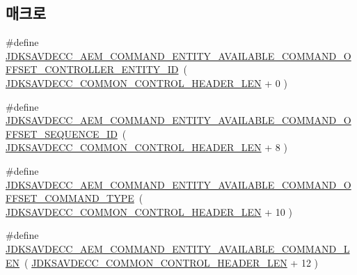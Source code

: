 \subsection*{매크로}
\begin{DoxyCompactItemize}
\item 
\#define \hyperlink{group__command__entity__available_ga964e8474e86735a78da5f889d44f0a71}{J\+D\+K\+S\+A\+V\+D\+E\+C\+C\+\_\+\+A\+E\+M\+\_\+\+C\+O\+M\+M\+A\+N\+D\+\_\+\+E\+N\+T\+I\+T\+Y\+\_\+\+A\+V\+A\+I\+L\+A\+B\+L\+E\+\_\+\+C\+O\+M\+M\+A\+N\+D\+\_\+\+O\+F\+F\+S\+E\+T\+\_\+\+C\+O\+N\+T\+R\+O\+L\+L\+E\+R\+\_\+\+E\+N\+T\+I\+T\+Y\+\_\+\+ID}~( \hyperlink{group__jdksavdecc__avtp__common__control__header_gaae84052886fb1bb42f3bc5f85b741dff}{J\+D\+K\+S\+A\+V\+D\+E\+C\+C\+\_\+\+C\+O\+M\+M\+O\+N\+\_\+\+C\+O\+N\+T\+R\+O\+L\+\_\+\+H\+E\+A\+D\+E\+R\+\_\+\+L\+EN} + 0 )
\item 
\#define \hyperlink{group__command__entity__available_gab81d785f6c70496364a6dc5c6cf2fa9e}{J\+D\+K\+S\+A\+V\+D\+E\+C\+C\+\_\+\+A\+E\+M\+\_\+\+C\+O\+M\+M\+A\+N\+D\+\_\+\+E\+N\+T\+I\+T\+Y\+\_\+\+A\+V\+A\+I\+L\+A\+B\+L\+E\+\_\+\+C\+O\+M\+M\+A\+N\+D\+\_\+\+O\+F\+F\+S\+E\+T\+\_\+\+S\+E\+Q\+U\+E\+N\+C\+E\+\_\+\+ID}~( \hyperlink{group__jdksavdecc__avtp__common__control__header_gaae84052886fb1bb42f3bc5f85b741dff}{J\+D\+K\+S\+A\+V\+D\+E\+C\+C\+\_\+\+C\+O\+M\+M\+O\+N\+\_\+\+C\+O\+N\+T\+R\+O\+L\+\_\+\+H\+E\+A\+D\+E\+R\+\_\+\+L\+EN} + 8 )
\item 
\#define \hyperlink{group__command__entity__available_ga42ddd7761657a2c7a31c31f5238ec935}{J\+D\+K\+S\+A\+V\+D\+E\+C\+C\+\_\+\+A\+E\+M\+\_\+\+C\+O\+M\+M\+A\+N\+D\+\_\+\+E\+N\+T\+I\+T\+Y\+\_\+\+A\+V\+A\+I\+L\+A\+B\+L\+E\+\_\+\+C\+O\+M\+M\+A\+N\+D\+\_\+\+O\+F\+F\+S\+E\+T\+\_\+\+C\+O\+M\+M\+A\+N\+D\+\_\+\+T\+Y\+PE}~( \hyperlink{group__jdksavdecc__avtp__common__control__header_gaae84052886fb1bb42f3bc5f85b741dff}{J\+D\+K\+S\+A\+V\+D\+E\+C\+C\+\_\+\+C\+O\+M\+M\+O\+N\+\_\+\+C\+O\+N\+T\+R\+O\+L\+\_\+\+H\+E\+A\+D\+E\+R\+\_\+\+L\+EN} + 10 )
\item 
\#define \hyperlink{group__command__entity__available_ga30ae597e2bbf5439d01764cc00618fd7}{J\+D\+K\+S\+A\+V\+D\+E\+C\+C\+\_\+\+A\+E\+M\+\_\+\+C\+O\+M\+M\+A\+N\+D\+\_\+\+E\+N\+T\+I\+T\+Y\+\_\+\+A\+V\+A\+I\+L\+A\+B\+L\+E\+\_\+\+C\+O\+M\+M\+A\+N\+D\+\_\+\+L\+EN}~( \hyperlink{group__jdksavdecc__avtp__common__control__header_gaae84052886fb1bb42f3bc5f85b741dff}{J\+D\+K\+S\+A\+V\+D\+E\+C\+C\+\_\+\+C\+O\+M\+M\+O\+N\+\_\+\+C\+O\+N\+T\+R\+O\+L\+\_\+\+H\+E\+A\+D\+E\+R\+\_\+\+L\+EN} + 12 )
\end{DoxyCompactItemize}
